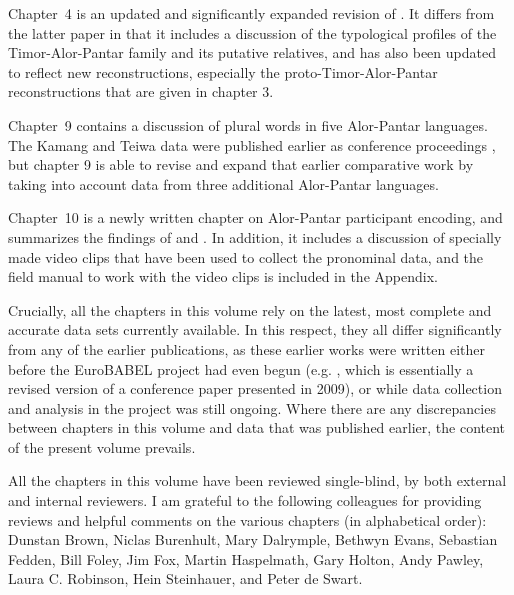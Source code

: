 \documentclass[output=paper]{LSP/langsci}
\begin{document}
	Chapter~4 is an updated and significantly expanded revision of \citet{RobinsonEtAl2012reassessing}. It differs from the latter paper in that it includes a discussion of the typological profiles of the Timor-Alor-Pantar family and its putative relatives, and has also been updated to reflect new reconstructions, especially the proto-Timor-Alor-Pantar reconstructions that are given in chapter 3. 
	
	Chapter~9 contains a discussion of plural words in five Alor-Pantar languages. The Kamang and Teiwa data were published earlier as conference proceedings \citep{SchapperEtAl2011plural}, but chapter 9 is able to revise and expand that earlier comparative work by taking into account data from three additional Alor-Pantar languages.
	
	Chapter~10 is a newly written chapter on Alor-Pantar participant encoding, and summarizes the findings of \citet{FeddenEtAl2013} and \citet{FeddenEtAl2014}. In addition, it includes a discussion of specially made video clips that have been used to collect the pronominal data, and the field manual to work with the video clips is included in the Appendix.
	
	Crucially, all the chapters in this volume rely on the latest, most complete and accurate data sets currently available. In this respect, they all differ significantly from any of the earlier publications, as these earlier works were written either before the EuroBABEL project had even begun (e.g. \citet{HoltonEtAl2012}, which is essentially a revised version of a conference paper presented in 2009), or while data collection and analysis in the project was still ongoing. Where there are any discrepancies between chapters in this volume and data that was published earlier, the content of the present volume prevails.
	
	All the chapters in this volume have been reviewed single-blind, by both external and internal reviewers. I am grateful to the following colleagues for providing reviews and helpful comments on the various chapters (in alphabetical order): Dunstan Brown, Niclas Burenhult, Mary Dalrymple, Bethwyn Evans, Sebastian Fedden, Bill Foley, Jim Fox, Martin Haspelmath, Gary Holton, Andy Pawley, Laura C. Robinson, Hein Steinhauer, and Peter de Swart.
	
\printbibliography[heading=subbibliography,notkeyword=this]
\end{document}
